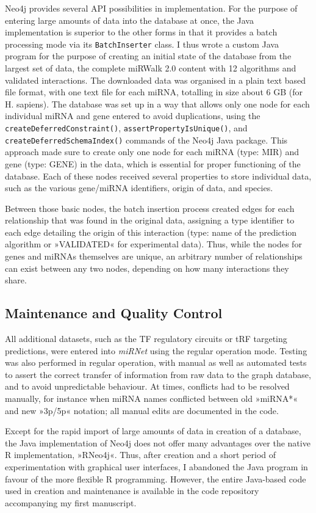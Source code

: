 Neo4j provides several API possibilities in implementation. For the purpose of entering large amounts of data into the database at once, the Java implementation is superior to the other forms in that it provides a batch processing mode via its \texttt{BatchInserter} class. I thus wrote a custom Java program for the purpose of creating an initial state of the database from the largest set of data, the complete miRWalk 2.0 content with 12 algorithms and validated interactions. The downloaded data was organised in a plain text based file format, with one text file for each miRNA, totalling in size about 6 GB (for H. sapiens). The database was set up in a way that allows only one node for each individual miRNA and gene entered to avoid duplications, using the \texttt{createDeferredConstraint()}, \texttt{assertPropertyIsUnique()}, and \texttt{createDeferredSchemaIndex()} commands of the Neo4j Java package. This approach made sure to create only one node for each miRNA (type: MIR) and gene (type: GENE) in the data, which is essential for proper functioning of the database. Each of these nodes received several properties to store individual data, such as the various gene/miRNA identifiers, origin of data, and species. 

Between those basic nodes, the batch insertion process created edges for each relationship that was found in the original data, assigning a type identifier to each edge detailing the origin of this interaction (type: name of the prediction algorithm or »VALIDATED« for experimental data). Thus, while the nodes for genes and miRNAs themselves are unique, an arbitrary number of relationships can exist between any two nodes, depending on how many interactions they share.

\subsection{Maintenance and Quality Control}
All additional datasets, such as the TF regulatory circuits or tRF targeting predictions, were entered into \textit{miRNet} using the regular operation mode. Testing was also performed in regular operation, with manual as well as automated tests to assert the correct transfer of information from raw data to the graph database, and to avoid unpredictable behaviour. At times, conflicts had to be resolved manually, for instance when miRNA names conflicted between old »miRNA*« and new »3p/5p« notation; all manual edits are documented in the code.

Except for the rapid import of large amounts of data in creation of a database, the Java implementation of Neo4j does not offer many advantages over the native R implementation, »RNeo4j«. Thus, after creation and a short period of experimentation with graphical user interfaces, I abandoned the Java program in favour of the more flexible R programming. However, the entire Java-based code used in creation and maintenance is available in the code repository accompanying my first manuscript\cite{Lobentanzer2019}.

